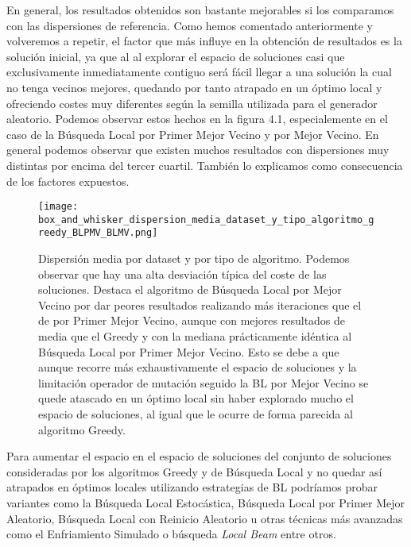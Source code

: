 En general, los resultados obtenidos son bastante mejorables si los comparamos con las dispersiones de referencia. Como hemos
comentado anteriormente y volveremos a repetir, el factor que más influye en la obtención de resultados es la solución inicial,
ya que al al explorar el espacio de soluciones casi que exclusivamente inmediatamente contiguo será fácil llegar a una solución
la cual no tenga vecinos mejores, quedando por tanto atrapado en un óptimo local y ofreciendo costes muy diferentes según la semilla
utilizada para el generador aleatorio.
Podemos observar estos hechos en la figura 4.1, especialemente en el caso de la Búsqueda Local por Primer Mejor Vecino y por Mejor Vecino.
En general podemos observar que existen muchos resultados con dispersiones muy distintas por encima del tercer cuartil. También lo explicamos
como consecuencia de los factores expuestos.

\begin{figure}[ht]
    \centering
    \texttt{[image: box\_and\_whisker\_dispersion\_media\_dataset\_y\_tipo\_algoritmo\_greedy\_BLPMV\_BLMV.png]}
    \caption{Dispersión media por dataset y por tipo de algoritmo. Podemos observar que hay una alta desviación típica del coste de las soluciones.
    Destaca el algoritmo de Búsqueda Local por Mejor Vecino por dar peores resultados realizando más iteraciones que el de por Primer
    Mejor Vecino, aunque con mejores resultados de media que el Greedy y con la mediana prácticamente idéntica al Búsqueda Local por Primer Mejor Vecino.
    Esto se debe a que aunque recorre más exhaustivamente el espacio de soluciones y la limitación operador de mutación seguido la BL por Mejor Vecino
    se quede atascado en un óptimo local sin haber explorado mucho el espacio de soluciones, al igual que le ocurre de forma parecida al algoritmo Greedy.}
\end{figure}

Para aumentar el espacio en el espacio de soluciones del conjunto de soluciones consideradas por los algoritmos Greedy y de Búsqueda Local y no quedar
así atrapados en óptimos locales utilizando estrategias de BL podríamos probar variantes como la Búsqueda Local Estocástica, Búsqueda Local por Primer Mejor Aleatorio, Búsqueda Local
con Reinicio Aleatorio u otras técnicas más avanzadas como el Enfriamiento Simulado o búsqueda \textit{Local Beam} entre otros.\cite[Sección 4.1]{russell2020artificial}



